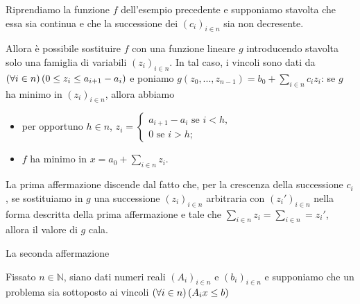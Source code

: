 \begin{Example}
	Riprendiamo la funzione $f$ dell'esempio precedente e supponiamo stavolta che essa sia continua e che la successione dei $(c_i)_{i \in n}$ sia non decresente.
	\par Allora \`e possibile sostituire $f$ con una funzione lineare $g$ introducendo stavolta solo una famiglia di variabili $(z_i)_{i \in n}$. In tal caso, i vincoli sono dati da $\left ( \forall i \in n \right ) \left ( 0 \leq z_i \leq a_{i + 1} - a_i \right )$ e poniamo $g(z_0,...,z_{n - 1}) = b_0 + \sum_{i \in n}c_iz_i$: se $g$ ha minimo in $(z_i)_{i \in n}$, allora abbiamo
	\begin{itemize}
		\item per opportuno $h \in n$, $z_i = \begin{cases}a_{i + 1} - a_i\text{ se }i < h,\\0\text{ se }i > h;\end{cases}$
		\item $f$ ha minimo in $x = a_0 + \sum_{i \in n} z_i$.
	\end{itemize}
	\par La prima affermazione discende dal fatto che, per la crescenza della successione $c_i$, se sostituiamo in $g$ una successione $(z_i)_{i \in n}$ arbitraria con $(z_i')_{i \in n}$ nella forma descritta della prima affermazione e tale che $\sum_{i \in n} z_i = \sum_{i \in n} = z_i'$, allora il valore di $g$ cala.
	\par La seconda affermazione
\end{Example}
\begin{Definition}
	Fissato $n \in \mathbb{N}$, siano dati numeri reali $(A_i)_{i \in n}$ e $(b_i)_{i \in n}$ e supponiamo che un problema sia sottoposto ai vincoli $\left ( \forall i \in n \right ) \left ( A_ix \leq b \right )$
\end{Definition}
